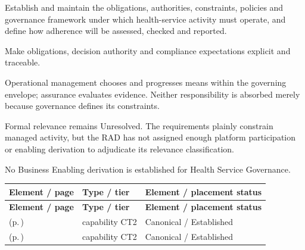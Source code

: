 
Establish and maintain the obligations, authorities, constraints, policies and governance framework under which health-service activity must operate, and define how adherence will be assessed, checked and reported.



Make obligations, decision authority and compliance expectations explicit and traceable.



Operational management chooses and progresses means within the governing envelope; assurance evaluates evidence. Neither responsibility is absorbed merely because governance defines its constraints.



Formal relevance remains Unresolved. The requirements plainly constrain managed activity, but the RAD has not assigned enough platform participation or enabling derivation to adjudicate its relevance classification.



No Business Enabling derivation is established for Health Service Governance.


\begingroup\small\setlength{\TableWidth}{\dimexpr\linewidth-6\tabcolsep-4\arrayrulewidth\relax}
\begin{longtable}{|>{\raggedright\arraybackslash}p{0.52\TableWidth}|>{\raggedright\arraybackslash}p{0.2\TableWidth}|>{\raggedright\arraybackslash}p{0.28\TableWidth}|}
\hline\rowcolor{TableHead}\textbf{Element / page} & \textbf{Type / tier} & \textbf{Element / placement status}\\\hline\endfirsthead
\hline\rowcolor{TableHead}\textbf{Element / page} & \textbf{Type / tier} & \textbf{Element / placement status}\\\hline\endhead
\hline\endfoot
\nameref{cap:bc-governance-framework-management} (p.\,\pageref{cap:bc-governance-framework-management}) & capability CT2 & Canonical / Established\\\hline
\nameref{cap:bc-compliance-governance} (p.\,\pageref{cap:bc-compliance-governance}) & capability CT2 & Canonical / Established\\\hline
\end{longtable}\endgroup

